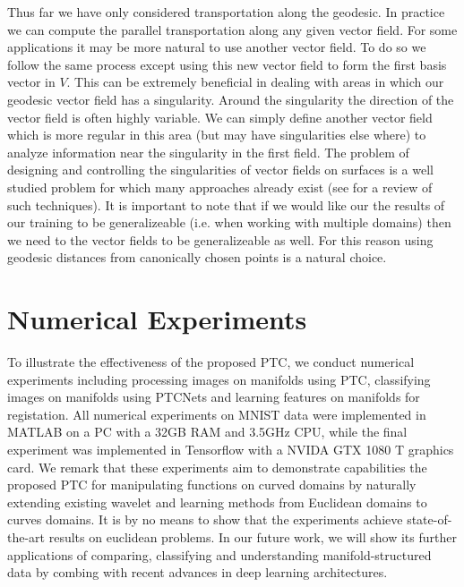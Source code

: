 \documentclass[10pt,twocolumn,letterpaper]{article}
\begin{document}
Thus far we have only considered transportation along the geodesic. In practice we can compute the parallel transportation along any given vector field. For some applications it may be more natural to use another vector field. To do so we follow the same process except using this new vector field to form the first basis vector in $V$. This can be extremely beneficial in dealing with areas in which our geodesic vector field has a singularity. Around the singularity the direction of the vector field is often highly variable. We can simply define another vector field which is more regular in this area (but may have singularities else where) to analyze information near the singularity in the first field. The problem of designing and controlling the singularities of vector fields on surfaces is a well studied problem for which many approaches already exist (see \cite{DeGoe2015vector} for a review of such techniques). It is important to note that if we would like our the results of our training to be generalizeable (i.e. when working with multiple domains) then we need to the vector fields to be generalizeable as well. For this reason using geodesic distances from canonically chosen points is a natural choice.


\section{Numerical Experiments}
\label{sec:experiments}
To illustrate the effectiveness of the proposed PTC,  we conduct numerical experiments including processing images on manifolds using PTC, classifying images on manifolds using PTCNets and learning features on manifolds for registation. All numerical experiments on MNIST data were implemented in MATLAB on a PC with a 32GB RAM and 3.5GHz CPU, while the final experiment was implemented in Tensorflow with a NVIDA GTX 1080 T graphics card.
We remark that these experiments aim to demonstrate capabilities the proposed PTC for manipulating functions on curved domains by naturally extending existing wavelet and learning methods from Euclidean domains to curves domains. It is by no means to show that the experiments achieve state-of-the-art results on euclidean problems. In our future work, we will show its further applications of comparing, classifying and understanding manifold-structured data by combing with recent advances in deep learning architectures.
\end{document}
